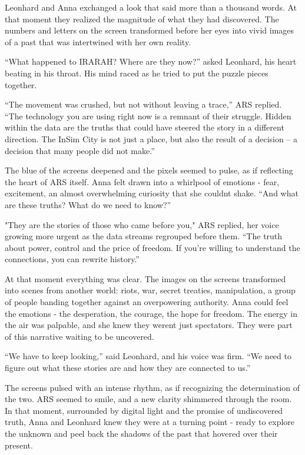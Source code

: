 \documentclass[
]{article}
\begin{document}
Leonhard and Anna exchanged a look that said more than a thousand words.
At that moment they realized the magnitude of what they had discovered.
The numbers and letters on the screen transformed before her eyes into
vivid images of a past that was intertwined with her own reality.

``What happened to IRARAH? Where are they now?'' asked Leonhard, his
heart beating in his throat. His mind raced as he tried to put the
puzzle pieces together.

``The movement was crushed, but not without leaving a trace,'' ARS
replied. ``The technology you are using right now is a remnant of their
struggle. Hidden within the data are the truths that could have steered
the story in a different direction. The InSim City is not just a place,
but also the result of a decision -- a decision that many people did not
make.''

The blue of the screens deepened and the pixels seemed to pulse, as if
reflecting the heart of ARS itself. Anna felt drawn into a whirlpool of
emotions - fear, excitement, an almost overwhelming curiosity that she
couldn\textquotesingle t shake. ``And what are these truths? What do we
need to know?''

"They are the stories of those who came before you," ARS replied, her
voice growing more urgent as the data streams regrouped before them.
``The truth about power, control and the price of freedom. If you're
willing to understand the connections, you can rewrite history.''

At that moment everything was clear. The images on the screens
transformed into scenes from another world: riots, war, secret treaties,
manipulation, a group of people banding together against an overpowering
authority. Anna could feel the emotions - the desperation, the courage,
the hope for freedom. The energy in the air was palpable, and she knew
they weren\textquotesingle t just spectators. They were part of this
narrative waiting to be uncovered.

``We have to keep looking,'' said Leonhard, and his voice was firm. ``We
need to figure out what these stories are and how they are connected to
us.''

The screens pulsed with an intense rhythm, as if recognizing the
determination of the two. ARS seemed to smile, and a new clarity
shimmered through the room. In that moment, surrounded by digital light
and the promise of undiscovered truth, Anna and Leonhard knew they were
at a turning point - ready to explore the unknown and peel back the
shadows of the past that hovered over their present.
\end{document}
